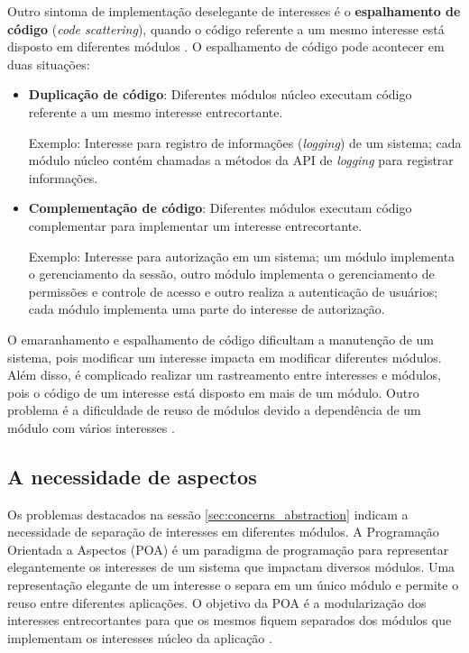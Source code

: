 Outro sintoma de implementação deselegante de interesses é o \textbf{espalhamento de código} (\textit{code scattering}), quando o código 
referente a um mesmo interesse está disposto em diferentes módulos \cite{Laddad:2003:AAP:993468}. O espalhamento de código pode acontecer em duas
situações:

\begin{itemize}
  \item \textbf{Duplicação de código}: Diferentes módulos núcleo executam código
  referente a um mesmo interesse entrecortante.  
  
  Exemplo: Interesse para registro de informações (\textit{logging}) de um
  sistema; cada módulo núcleo contém chamadas a métodos da API
  de \textit{logging} para registrar informações.
  
  \item \textbf{Complementação de código}: Diferentes módulos executam código
  complementar para implementar um interesse entrecortante. 
  
  Exemplo: Interesse para autorização em um sistema; um módulo implementa o
  gerenciamento da sessão, outro módulo implementa o gerenciamento de
  permissões e controle de acesso e outro realiza a autenticação de usuários;
  cada módulo implementa uma parte do interesse de autorização.
\end{itemize}

O emaranhamento e espalhamento de código dificultam a manutenção de um sistema,
pois modificar um interesse impacta em modificar diferentes módulos. Além
disso, é complicado realizar um rastreamento entre interesses e módulos, pois o
código de um interesse está disposto em mais de um módulo. Outro problema é a
dificuldade de reuso de módulos devido a dependência de um módulo com vários
interesses \cite{Laddad:2003:AAP:993468}. 

\subsection{A necessidade de aspectos}

Os problemas destacados na sessão \ref{sec:concerns_abstraction} indicam a
necessidade de separação de interesses em diferentes módulos. A Programação Orientada a Aspectos 
(POA) \cite{Kiczales97aspect-orientedprogramming} é um paradigma de programação para representar
elegantemente os interesses de um sistema que impactam diversos módulos. 
Uma representação elegante de um interesse o separa em um único módulo e permite
o reuso entre diferentes aplicações. O objetivo da POA é a modularização dos interesses entrecortantes 
para que os mesmos fiquem separados dos módulos que implementam os interesses
núcleo da aplicação \cite{Laddad:2003:AAP:993468}.

